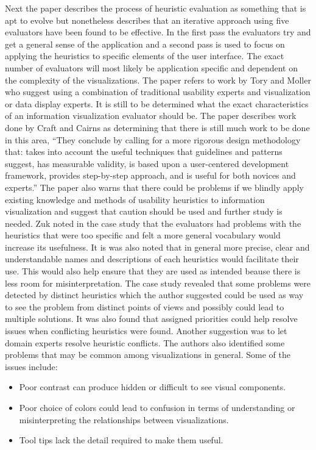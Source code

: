 \documentclass{sig-alternate}
\begin{document}
Next the paper describes the process of
heuristic evaluation as something that is apt to evolve but nonetheless
describes that an iterative approach using five evaluators have been found to be
effective. In the first pass the evaluators try and get a general sense of the
application and a second pass is used to focus on applying the heuristics to
specific elements of the user interface. The exact number of evaluators will
most likely be application specific and dependent on the complexity of the
visualizations. The paper refers to work by Tory and Moller
\cite{Tory:2005:EvaluatingVisualizations} who suggest using a combination of
traditional usability experts and visualization or data display experts. It is
still to be determined what the exact characteristics of an information
visualization evaluator should be.  The paper describes work done by Craft and
Cairns \cite{Craft:2005:VisualInformationSeekingMantra} as determining that
there is still much work to be done in this area, ``They conclude by calling for
a more rigorous design methodology that: takes into account the useful
techniques that guidelines and patterns suggest, has measurable validity, is
based upon a user-centered development framework, provides step-by-step
approach, and is useful for both novices and
experts.''\cite{Zuk:2006:HeuristicsForInformationVisualizationEvaluation} The
paper also warns that there could be problems if we blindly apply existing
knowledge and methods of usability heuristics to information visualization and
suggest that caution should be used and further study is needed. Zuk noted in
the case study that the evaluators had problems with the heuristics that were
too specific and felt a more general vocabulary would increase its usefulness.
It is was also noted that in general more precise, clear and understandable
names and descriptions of each heuristics would facilitate their use. This would
also help ensure that they are used as intended beause there is less room for
misinterpretation. The case study revealed that some problems were detected by distinct heuristics which the author suggested could be used as way to see the problem from distinct
points of views and possibly could lead to multiple solutions.  It was also
found that assigned priorities could help resolve issues when conflicting
heuristics were found. Another suggestion was to let domain experts resolve
heuristic conflicts. The authors also identified some problems that may be
common among visualizations in general. Some of the issues include:
\begin{itemize} \item Poor contrast can produce hidden or difficult to see
visual components. \item Poor choice of colors could lead to confusion in terms
of understanding or misinterpreting the relationships between visualizations.
\item Tool tips lack the detail required to make them useful.
\end{itemize}
\end{document}
